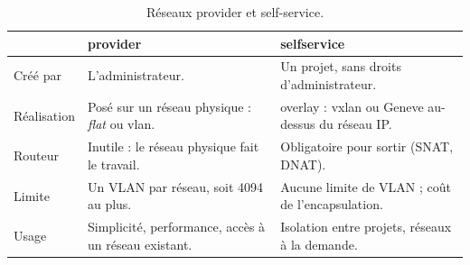 \begin{table}[!ht]
\centering
\renewcommand{\arraystretch}{1.3}
\begin{tabular}{@{}>{\raggedright\arraybackslash}p{3.0cm}>{\raggedright\arraybackslash}p{6.2cm}>{\raggedright\arraybackslash}p{6.3cm}@{}}
\toprule
 & \textbf{\Gls{provider}} & \textbf{\Gls{selfservice}} \\
\midrule
Créé par & L'administrateur. & Un projet, sans droits d'administrateur. \\
Réalisation & Posé sur un réseau physique : \emph{flat} ou \gls{vlan}. & \Gls{overlay} : \gls{vxlan} ou Geneve au-dessus du réseau IP. \\
Routeur & Inutile : le réseau physique fait le travail. & Obligatoire pour sortir (SNAT, DNAT). \\
Limite & Un VLAN par réseau, soit 4094 au plus. & Aucune limite de VLAN ; coût de l'encapsulation. \\
Usage & Simplicité, performance, accès à un réseau existant. & Isolation entre projets, réseaux à la demande. \\
\bottomrule
\end{tabular}
\caption{Réseaux provider et self-service.}
\label{tab:neu-types}
\end{table}

